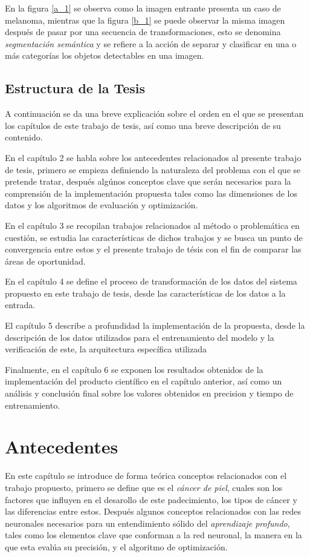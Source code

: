 En la figura \ref{a_1} se observa como la imagen entrante presenta un caso de melanoma, mientras que la figura \ref{b_1} se puede observar la misma imagen después de pasar por una secuencia de transformaciones, esto se denomina \emph{segmentación semántica} y se refiere a la acción de separar y clasificar en una o más categorías los objetos detectables en una imagen.

\section{Estructura de la Tesis}
A continuación se da una breve explicación sobre el orden en el que se presentan los capítulos de este trabajo de tesis, así como una breve descripción de su contenido.

En el capítulo 2 se habla sobre los antecedentes relacionados al presente trabajo de tesis, primero se empieza definiendo la naturaleza del problema con el que se pretende tratar, después algúnos conceptos clave que serán necesarios para la comprensión de la implementación propuesta tales como las dimensiones de los datos y los algoritmos de evaluación y optimización.

En el capítulo 3 se recopilan trabajos relacionados al método o problemática en cuestión, se estudia las características de dichos trabajos y se busca un punto de convergencia entre estos y el presente trabajo de tésis con el fin de comparar las áreas de oportunidad.

En el capítulo 4 se define el proceso de transformación de los datos del sistema propuesto en este trabajo de tesis, desde las características de los datos a la entrada.

El capítulo 5 describe a profundidad la implementación de la propuesta, desde la descripción de los datos utilizados para el entrenamiento del modelo y la verificación de este, la arquitectura específica utilizada 


Finalmente, en el capítulo 6 se exponen los resultados obtenidos de la implementación del producto científico en el capítulo anterior, así como un análisis y conclusión final sobre los valores obtenidos en precision y tiempo de entrenamiento. 

\chapter{Antecedentes}
En este capítulo se introduce de forma teórica conceptos relacionados con el trabajo propuesto, primero se define que es el \emph{cáncer de piel}, cuales son los factores que influyen en el desarollo de este padecimiento, los tipos de cáncer y las diferencias entre estos. Después algunos conceptos relacionados con las redes neuronales necesarios para un entendimiento sólido del \emph{aprendizaje profundo}, tales como los elementos clave que conforman a la red neuronal, la manera en la que esta evalúa su precisión, y el algoritmo de optimización.

